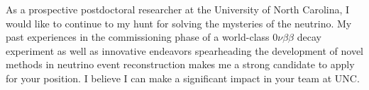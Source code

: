 \documentclass[10pt]{article} %
\begin{document}

As a prospective postdoctoral researcher at the University of North Carolina, I
would like to continue to my hunt for solving the mysteries of the neutrino. My
past experiences in the commissioning phase of a world-class $0\nu\beta\beta$
decay experiment as well as innovative endeavors spearheading the development
of novel methods in neutrino event reconstruction makes me a strong candidate
to apply for your position. I believe I can make a significant impact in your
team at UNC.
\end{document}
